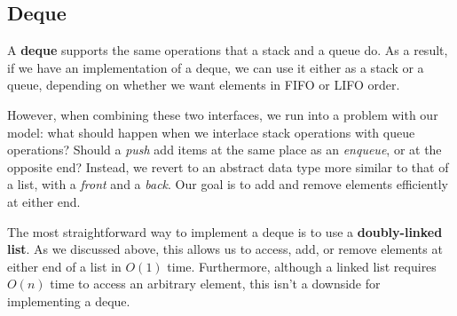 \subsection{Deque}



A \textbf{deque} supports the same operations that a stack and a queue do. As a result, if we have an implementation of a deque, we can use it either as a stack or a queue, depending on whether we want elements in FIFO or LIFO order. 

However, when combining these two interfaces, we run into a problem with our model: what should happen when we interlace stack operations with queue operations? Should a \textit{push} add items at the same place as an \textit{enqueue}, or at the opposite end? Instead, we revert to an abstract data type more similar to that of a list, with a \textit{front} and a \textit{back}. Our goal is to add and remove elements efficiently at either end.

The most straightforward way to implement a deque is to use a \textbf{doubly-linked list}. As we discussed above, this allows us to access, add, or remove elements at either end of a list in $O(1)$ time. Furthermore, although a linked list requires $O(n)$ time to access an arbitrary element, this isn't a downside for implementing a deque.


